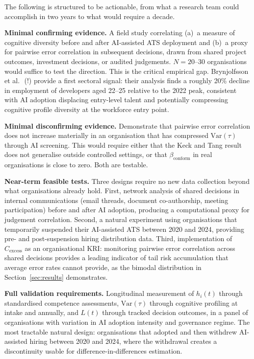 \documentclass[11pt,a4paper]{article}
\begin{document}
The following is structured to be actionable, from what a research team
could accomplish in two years to what would require a decade.

\textbf{Minimal confirming evidence.} A field study correlating (a)~a
measure of cognitive diversity before and after AI-assisted ATS deployment
and (b)~a proxy for pairwise error correlation in subsequent decisions,
drawn from shared project outcomes, investment decisions, or audited
judgements. $N = 20$--$30$ organisations would suffice to test the
direction. This is the critical empirical gap. Brynjolfsson et
al.~\cite{brynjolfsson_stanford_2025}\,(!) provide a first sectoral signal:
their analysis finds a roughly 20\% decline in employment of developers
aged 22--25 relative to the 2022 peak, consistent with AI adoption
displacing entry-level talent and potentially compressing cognitive profile
diversity at the workforce entry point.

\textbf{Minimal disconfirming evidence.} Demonstrate that pairwise error
correlation does not increase materially in an organisation that has
compressed $\text{Var}(\tau)$ through AI screening. This would require
either that the Keck and Tang result does not generalise outside controlled
settings, or that $\beta_{\text{conform}}$ in real organisations is close to
zero. Both are testable.

\textbf{Near-term feasible tests.} Three designs require no new data
collection beyond what organisations already hold. First, network analysis
of shared decisions in internal communications (email threads, document
co-authorship, meeting participation) before and after AI adoption,
producing a computational proxy for judgement correlation. Second, a natural
experiment using organisations that temporarily suspended their AI-assisted
ATS between 2020 and 2024, providing pre- and post-suspension hiring
distribution data. Third, implementation of $C_{\text{excess}}$ as an
organisational KRI: monitoring pairwise error correlation across shared
decisions provides a leading indicator of tail risk accumulation that
average error rates cannot provide, as the bimodal distribution in
Section~\ref{sec:results} demonstrates.

\textbf{Full validation requirements.} Longitudinal measurement of $h_i(t)$
through standardised competence assessments, $\text{Var}(\tau)$ through
cognitive profiling at intake and annually, and $L(t)$ through tracked
decision outcomes, in a panel of organisations with variation in AI adoption
intensity and governance regime. The most tractable natural design:
organisations that adopted and then withdrew AI-assisted hiring between 2020
and 2024, where the withdrawal creates a discontinuity usable for
difference-in-differences estimation.
\end{document}
